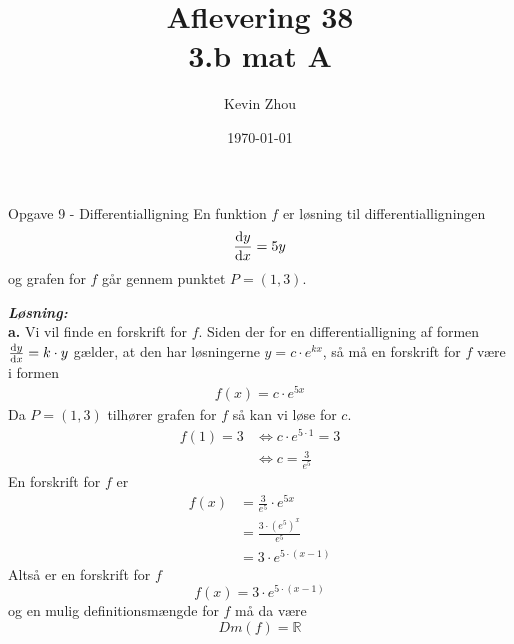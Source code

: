 \documentclass{article}
\title{Aflevering 38\\
{\Large \textbf{3.b mat A}}}
\author{Kevin Zhou}
\date{\today}
\newcommand{\sol}{\setlength{\parindent}{0cm}\textbf{\textit{Løsning:}}\setlength{\parindent}{1cm}}
\begin{document}
\maketitle
\newpage
\begin{question}{Opgave 9 - Differentialligning}{}
  En funktion $f$ er løsning til differentialligningen 
  \[
  \dv{y}{x}=5y
  \] 
  og grafen for $f$ går gennem punktet $P=(1,3)$. 
\end{question}
\sol \\
\textbf{a.} 
Vi vil finde en forskrift for $f$.
Siden der for en differentialligning af formen $\dv{y}{x}=k \cdot y$ gælder, at den har løsningerne $y=c \cdot e ^{kx}$, så må en forskrift for $f$ være i formen
\begin{equation*}
\begin{split}
f(x)= c \cdot e^{5x} 
\end{split}
\end{equation*}
Da $P=(1,3)$ tilhører grafen for $f$ så kan vi løse for $c$.
\begin{equation*}
\begin{split}
  f(1)= 3 &\iff c \cdot e^{5 \cdot 1} =3 \\
  &\iff c=\frac{3}{e^{5} }
\end{split}
\end{equation*}
En forskrift for $f$ er 
\begin{equation*}
\begin{split}
  f(x)&= \frac{3}{e^{5} } \cdot e^{5x} \\
  &=\frac{3 \cdot (e^{5})^x}{e^{5} }\\
  &=3 \cdot e^{5 \cdot (x-1)} 
\end{split}
\end{equation*}
Altså er en forskrift for $f$ 
\[
f(x)= 3 \cdot e^{5 \cdot (x-1)} 
\] 
og en mulig definitionsmængde for $f$ må da være 
\[
Dm(f)=\mathbb{R}
\] 
\end{document}
